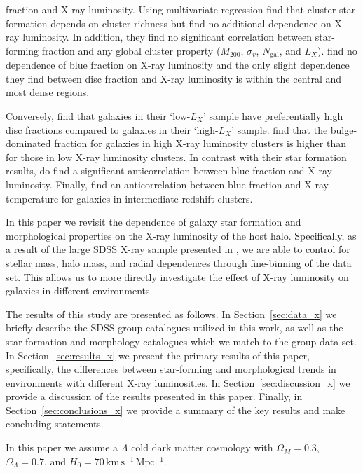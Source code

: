 fraction and X-ray luminosity.  Using multivariate regression
\citet{popesso2007b} find that cluster star formation depends on
cluster richness but find no additional dependence on X-ray
luminosity.  In addition, they find no significant correlation between
star-forming fraction and any global cluster property ($M_{200}$,
$\sigma_v$, $N_\mathrm{gal}$, and $L_X$).  \citet{lopes2014} find no
dependence of blue fraction on X-ray luminosity and the only slight
dependence they find between disc fraction and X-ray luminosity is
within the central and most dense regions.
\par
Conversely, \citet{balogh2002b} find that galaxies in their
`low-$L_X$' sample have preferentially high disc fractions compared to
galaxies in their `high-$L_X$' sample.  \citet{postman2005} find that
the bulge-dominated fraction for galaxies in high X-ray luminosity
clusters is higher than for those in low X-ray luminosity clusters.
In contrast with their star formation results, \citet{popesso2007b} do
find a significant anticorrelation between blue fraction and X-ray
luminosity.  Finally, \citet{urquhart2010} find an anticorrelation
between blue fraction and X-ray temperature for galaxies in
intermediate redshift clusters.
\par
In this paper we revisit the dependence of galaxy star formation and
morphological properties on the X-ray luminosity of the host halo.
Specifically, as a result of the large SDSS X-ray sample presented in
\citet{wang2014}, we are able to control for stellar mass, halo mass,
and radial dependences through fine-binning of the data set.  This
allows us to more directly investigate the effect of X-ray luminosity
on galaxies in different environments.
\par
The results of this study are presented as follows.  In
Section~\ref{sec:data_x} we briefly describe the SDSS group catalogues
utilized in this work, as well as the star formation and morphology
catalogues which we match to the group data set.  In
Section~\ref{sec:results_x} we present the primary results of this
paper, specifically, the differences between star-forming and
morphological trends in environments with different X-ray
luminosities.  In Section~\ref{sec:discussion_x} we provide a
discussion of the results presented in this paper.  Finally, in
Section~\ref{sec:conclusions_x} we provide a summary of the key
results and make concluding statements.
\par
In this paper we assume a $\Lambda$ cold dark matter cosmology with
$\Omega_M = 0.3$, $\Omega_\Lambda = 0.7$, and $H_0 = 70\,\mathrm{km}\,\mathrm{s^{-1}}\,\mathrm{Mpc^{-1}}$.

